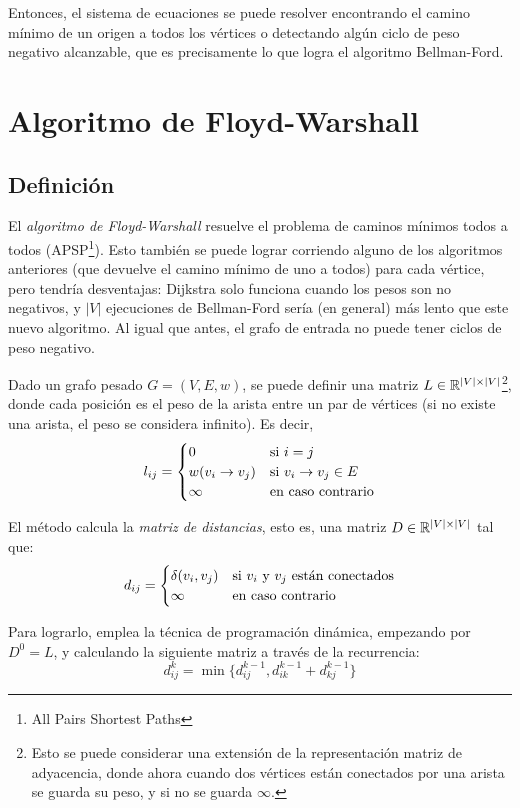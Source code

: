 Entonces, el sistema de ecuaciones se puede resolver encontrando el camino mínimo de un origen a todos los vértices o detectando algún ciclo de peso negativo alcanzable, que es precisamente lo que logra el algoritmo Bellman-Ford.

\section{Algoritmo de Floyd-Warshall}

\subsection{Definición}

El \textit{algoritmo de Floyd-Warshall} resuelve el problema de caminos mínimos todos a todos (APSP\footnote{All Pairs Shortest Paths}). Esto también se puede lograr corriendo alguno de los algoritmos anteriores (que devuelve el camino mínimo de uno a todos) para cada vértice, pero tendría desventajas: Dijkstra solo funciona cuando los pesos son no negativos, y $|V|$ ejecuciones  de Bellman-Ford sería (en general) más lento que este nuevo algoritmo. Al igual que antes, el grafo de entrada no puede tener ciclos de peso negativo.

Dado un grafo pesado $G = (V, E, w)$, se puede definir una matriz $L \in \mathbb{R}^{|V| \times |V|}$\footnote{Esto se puede considerar una extensión de la representación matriz de adyacencia, donde ahora cuando dos vértices están conectados por una arista se guarda su peso, y si no se guarda $\infty$.}, donde cada posición es el peso de la arista entre un par de vértices (si no existe una arista, el peso se considera infinito). Es decir,
$$
    l_{ij} =
    \begin{cases}
        0                      & \text{si } i = j                     \\
        w(v_i \rightarrow v_j) & \text{si } v_i \rightarrow v_j \in E \\
        \infty                 & \text{en caso contrario}
    \end{cases}
$$


El método calcula la \textit{matriz de distancias}, esto es, una matriz $D \in \mathbb{R}^{|V| \times |V|}$ tal que:
$$d_{ij} =
    \begin{cases}
        \delta(v_i, v_j) & \text{si } \text{$v_i$ y $v_j$ están conectados} \\
        \infty           & \text{en caso contrario}
    \end{cases}$$

Para lograrlo, emplea la técnica de programación dinámica, empezando por $D^0 = L$, y calculando la siguiente matriz a través de la recurrencia:
$$d^k_{ij} = \min{\{d^{k - 1}_{ij}, d^{k - 1}_{ik} + d^{k - 1}_{kj}\}}$$

